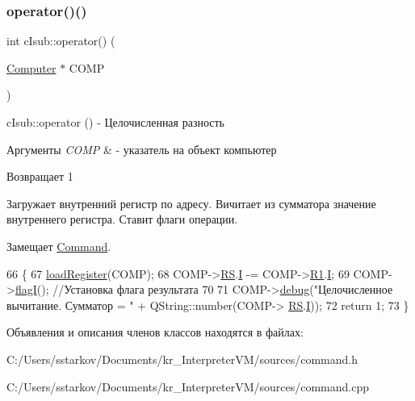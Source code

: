 \subsubsection{\texorpdfstring{operator()()}{operator()()}}
{\footnotesize\ttfamily int c\+Isub\+::operator() (\begin{DoxyParamCaption}\item[{\hyperlink{class_computer}{Computer} $\ast$}]{C\+O\+MP }\end{DoxyParamCaption})\hspace{0.3cm}{\ttfamily [virtual]}}



c\+Isub\+::operator () -\/ Целочисленная разность 


\begin{DoxyParams}{Аргументы}
{\em C\+O\+MP} & -\/ указатель на объект компьютер \\
\hline
\end{DoxyParams}
\begin{DoxyReturn}{Возвращает}
1
\end{DoxyReturn}
Загружает внутренний регистр по адресу. Вичитает из сумматора значение внутреннего регистра. Ставит флаги операции. 

Замещает \hyperlink{class_command_a79939b66f3de892e91d7710844294716}{Command}.


\begin{DoxyCode}
66 \{
67     \hyperlink{class_command_aac6f368e7c9dbb357b3f00627d5dabfc}{loadRegister}(COMP);
68     COMP->\hyperlink{class_computer_a874503110664b3cf821118d2ce9c2b96}{RS}.\hyperlink{union_computer_1_1data_a6e51de6e0351adc4e50b336a092bc4bb}{I} -= COMP->\hyperlink{class_computer_a0fbf84599b7db9d634a92afed443ee73}{R1}.\hyperlink{union_computer_1_1data_a6e51de6e0351adc4e50b336a092bc4bb}{I};
69     COMP->\hyperlink{class_computer_aae4a76a8a03a6c9fb1c12968d629be3e}{flagI}(); \textcolor{comment}{//Установка флага результата}
70 
71     COMP->\hyperlink{class_computer_a10ca6c6b200630119201de16d7368e0f}{debug}(\textcolor{stringliteral}{"Целочисленное вычитание. Сумматор = "} + QString::number(COMP->
      \hyperlink{class_computer_a874503110664b3cf821118d2ce9c2b96}{RS}.\hyperlink{union_computer_1_1data_a6e51de6e0351adc4e50b336a092bc4bb}{I}));
72     \textcolor{keywordflow}{return} 1;
73 \}
\end{DoxyCode}


Объявления и описания членов классов находятся в файлах\+:\begin{DoxyCompactItemize}
\item 
C\+:/\+Users/sstarkov/\+Documents/kr\+\_\+\+Interpreter\+V\+M/sources/command.\+h\item 
C\+:/\+Users/sstarkov/\+Documents/kr\+\_\+\+Interpreter\+V\+M/sources/command.\+cpp\end{DoxyCompactItemize}
